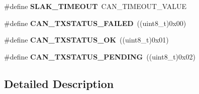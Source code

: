 \begin{DoxyCompactItemize}
\item 
\#define {\bfseries S\+L\+A\+K\+\_\+\+T\+I\+M\+E\+O\+UT}~C\+A\+N\+\_\+\+T\+I\+M\+E\+O\+U\+T\+\_\+\+V\+A\+L\+UE\hypertarget{group___h_a_l___c_a_n___aliased___defines_ga1bb8107706c8b4039ac55a122f3c65bb}{}\label{group___h_a_l___c_a_n___aliased___defines_ga1bb8107706c8b4039ac55a122f3c65bb}

\item 
\#define {\bfseries C\+A\+N\+\_\+\+T\+X\+S\+T\+A\+T\+U\+S\+\_\+\+F\+A\+I\+L\+ED}~((uint8\+\_\+t)0x00)\hypertarget{group___h_a_l___c_a_n___aliased___defines_gad6f04a4437ad8e83b154523f20985796}{}\label{group___h_a_l___c_a_n___aliased___defines_gad6f04a4437ad8e83b154523f20985796}

\item 
\#define {\bfseries C\+A\+N\+\_\+\+T\+X\+S\+T\+A\+T\+U\+S\+\_\+\+OK}~((uint8\+\_\+t)0x01)\hypertarget{group___h_a_l___c_a_n___aliased___defines_ga01cd38ecda448043ba6a7870ab62fc2b}{}\label{group___h_a_l___c_a_n___aliased___defines_ga01cd38ecda448043ba6a7870ab62fc2b}

\item 
\#define {\bfseries C\+A\+N\+\_\+\+T\+X\+S\+T\+A\+T\+U\+S\+\_\+\+P\+E\+N\+D\+I\+NG}~((uint8\+\_\+t)0x02)\hypertarget{group___h_a_l___c_a_n___aliased___defines_gaf63b6b17ef36507122e0eaac8395aa1c}{}\label{group___h_a_l___c_a_n___aliased___defines_gaf63b6b17ef36507122e0eaac8395aa1c}

\end{DoxyCompactItemize}


\subsection{Detailed Description}
